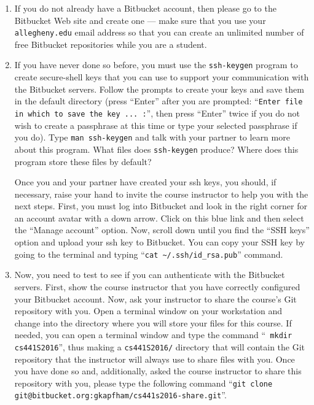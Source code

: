 \begin{enumerate}

  \item If you do not already have a Bitbucket account, then please go to the Bitbucket Web site and create one --- make sure
    that you use your {\tt allegheny.edu} email address so that you can create an unlimited number of free Bitbucket
    repositories while you are a student.

  \item If you have never done so before, you must use the {\tt ssh-keygen} program to create secure-shell keys that you
    can use to support your communication with the Bitbucket servers. Follow the prompts to create your keys and save
    them in the default directory (press ``Enter'' after you are prompted: ``{\tt Enter file in which to save the key ...
    :}'', then press ``Enter'' twice if you do not wish to create a passphrase at this time or type your selected
    passphrase if you do).   Type {\tt man ssh-keygen} and talk with your partner to learn more about this program.
    What files does {\tt ssh-keygen} produce?  Where does this program store these files by default?

    Once you and your partner have created your ssh keys, you should, if necessary, raise your hand to invite the course
    instructor to help you with the next steps. First, you must log into Bitbucket and look in the right corner for an
    account avatar with a down arrow.  Click on this blue link and then select the ``Manage account'' option. Now,
    scroll down until you find the ``SSH keys'' option and upload your ssh key to Bitbucket. You can copy your SSH key
    by going to the terminal and typing ``{\tt cat \textasciitilde{}/.ssh/id\_rsa.pub}'' command.

  \item Now, you need to test to see if you can authenticate with the Bitbucket servers.  First, show the course
    instructor that you have correctly configured your Bitbucket account.  Now, ask your instructor to share the
    course's Git repository with you.  Open a terminal window on your workstation and change into the directory where
    you will store your files for this course.  If needed, you can open a terminal window and type the command ``{\tt
      mkdir cs441S2016}'', thus making a {\tt cs441S2016/} directory that will contain the Git repository that the
      instructor will always use to share files with you.  Once you have done so and, additionally, asked the course
      instructor to share this repository with you, please type the following command ``{\tt git clone
      git@bitbucket.org:gkapfham/cs441s2016-share.git}''.


\end{enumerate}
